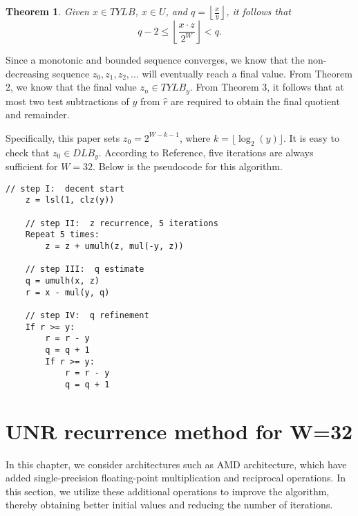 \documentclass[12pt]{elsarticle}
\newtheorem{theorem}{Theorem}
\begin{document}
\begin{theorem}\cite{rodeheffer2008software}\label{thm3}
    Given \( x \in TYLB \), \( x \in U \), and \( q = \left\lfloor \frac{x}{y} \right\rfloor \), it follows that
    \[
    q - 2 \le \left\lfloor \frac{x \cdot z }{2^W} \right\rfloor < q.
    \]
\end{theorem}

Since a monotonic and bounded sequence converges, we know that the non-decreasing sequence \( z_0, z_1, z_2, \ldots \) will eventually reach a final value. From Theorem 2, we know that the final value \( z_n \in TYLB_y \). From Theorem 3, it follows that at most two test subtractions of \( y \) from \( \hat{r} \) are required to obtain the final quotient and remainder.





Specifically, this paper\cite{rodeheffer2008software} sets \( z_0 = 2^{W-k-1} \), where \( k = \lfloor \log_2(y) \rfloor \). It is easy to check that \( z_0 \in DLB_y \). According to Reference\cite{rodeheffer2008software}, five iterations are always sufficient for \( W = 32 \). Below is the pseudocode for this algorithm. \\


\begin{Verbatim}[frame=single, fontsize=\small, label={Algorithm 1: UNR recurrence method for W=32.}]
    // step I:  decent start
    z = lsl(1, clz(y))
    
    // step II:  z recurrence, 5 iterations
    Repeat 5 times:
        z = z + umulh(z, mul(-y, z))
    
    // step III:  q estimate
    q = umulh(x, z)
    r = x - mul(y, q)
    
    // step IV:  q refinement
    If r >= y:
        r = r - y
        q = q + 1
        If r >= y:
            r = r - y
            q = q + 1
    \end{Verbatim}


 
\section{UNR recurrence method for W=32}
In this chapter, we consider architectures such as AMD architecture, which have added single-precision floating-point multiplication and reciprocal operations. In this section, we utilize these additional operations to improve the algorithm, thereby obtaining better initial values and reducing the number of iterations.
\end{document}

